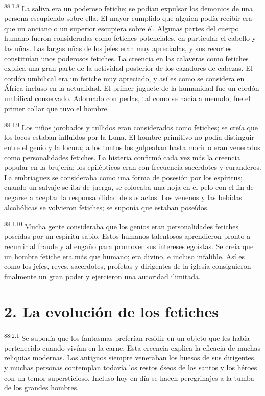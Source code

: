 \documentclass[twoside, 11pt]{book}
\begin{document}
\par
\textsuperscript{88:1.8} La saliva era un poderoso fetiche; se podían expulsar los demonios de una persona escupiendo sobre ella. El mayor cumplido que alguien podía recibir era que un anciano o un superior escupiera sobre él. Algunas partes del cuerpo humano fueron consideradas como fetiches potenciales, en particular el cabello y las uñas. Las largas uñas de los jefes eran muy apreciadas, y sus recortes constituían unos poderosos fetiches. La creencia en las calaveras como fetiches explica una gran parte de la actividad posterior de los cazadores de cabezas. El cordón umbilical era un fetiche muy apreciado, y así es como se considera en África incluso en la actualidad. El primer juguete de la humanidad fue un cordón umbilical conservado. Adornado con perlas, tal como se hacía a menudo, fue el primer collar que tuvo el hombre.

\par
\textsuperscript{88:1.9} Los niños jorobados y tullidos eran considerados como fetiches; se creía que los locos estaban influidos por la Luna. El hombre primitivo no podía distinguir entre el genio y la locura; a los tontos los golpeaban hasta morir o eran venerados como personalidades fetiches. La histeria confirmó cada vez más la creencia popular en la brujería; los epilépticos eran con frecuencia sacerdotes y curanderos. La embriaguez se consideraba como una forma de posesión por los espíritus; cuando un salvaje se iba de juerga, se colocaba una hoja en el pelo con el fin de negarse a aceptar la responsabilidad de sus actos. Los venenos y las bebidas alcohólicas se volvieron fetiches; se suponía que estaban poseídos.

\par
\textsuperscript{88:1.10} Mucha gente consideraba que los genios eran personalidades fetiches poseídas por un espíritu sabio. Estos humanos talentosos aprendieron pronto a recurrir al fraude y al engaño para promover sus intereses egoístas. Se creía que un hombre fetiche era más que humano; era divino, e incluso infalible. Así es como los jefes, reyes, sacerdotes, profetas y dirigentes de la iglesia consiguieron finalmente un gran poder y ejercieron una autoridad ilimitada.

\section*{2. La evolución de los fetiches}
\par
\textsuperscript{88:2.1} Se suponía que los fantasmas preferían residir en un objeto que les había pertenecido cuando vivían en la carne. Esta creencia explica la eficacia de muchas reliquias modernas. Los antiguos siempre veneraban los huesos de sus dirigentes, y muchas personas contemplan todavía los restos óseos de los santos y los héroes con un temor supersticioso. Incluso hoy en día se hacen peregrinajes a la tumba de los grandes hombres.
\end{document}
